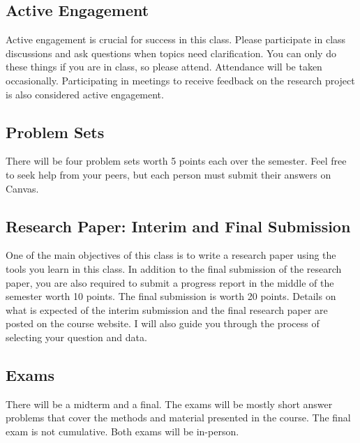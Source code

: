 \documentclass{syllabus}
\begin{document}
\subsection*{Active Engagement}
Active engagement is crucial for success in this class. Please participate in class discussions and ask questions when topics need clarification. You can only do these things if you are in class, so please attend. Attendance will be taken occasionally. Participating in meetings to receive feedback on the research project is also considered active engagement.  %

\subsection*{Problem Sets}
There will be four problem sets worth 5 points each over the semester. Feel free to seek help from your peers, but each person must submit their answers on Canvas.

\subsection*{Research Paper: Interim and Final Submission}
One of the main objectives of this class is to write a research paper using the tools you learn in this class. In addition to the final submission of the research paper, you are also required to submit a progress report in the middle of the semester worth 10 points. The final submission is worth 20 points. Details on what is expected of the interim submission and the final research paper are posted on the course website. I will also guide you through the process of selecting your question and data.

\subsection*{Exams}
There will be a midterm and a final. The exams will be mostly short answer problems that cover the methods and material presented in the course. The final exam is not cumulative. Both exams will be in-person.

\end{document}
